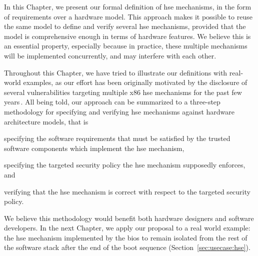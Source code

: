 In this Chapter, we present our formal definition of \ac{hse} mechanisms, in the
form of requirements over a hardware model.
%
This approach makes it possible to reuse the same model to define and verify
several \ac{hse} mechanisms, provided that the model is comprehensive enough in
terms of hardware features.
%
We believe this is an essential property, especially because in practice, these
multiple mechanisms will be implemented concurrently, and may interfere with
each other.

%

Throughout this Chapter, we have tried to illustrate our definitions with
real-world examples, as our effort has been originally motivated by the
disclosure of several vulnerabilities targeting multiple x86 \ac{hse} mechanisms
for the past few
years\,\cite{wojtczuk2009smram,duflot2009smram,rutkowska2008remap,domas2015sinkhole,kallenberg2015racecondition}.
%
All being told, our approach can be summarized to a three-step methodology for
specifying and verifying \ac{hse} mechanisms against hardware architecture
models, that is
%
\begin{inparaenum}[(1)]
\item specifying the software requirements that must be satisfied by the trusted
  software components which implement the \ac{hse} mechanism,
%
\item specifying the targeted security policy the \ac{hse} mechanism supposedly
  enforces, and
%
\item verifying that the \ac{hse} mechanism is correct with respect to the
  targeted security policy.
\end{inparaenum}
%
We believe this methodology would benefit both hardware designers and software
developers.
%
In the next Chapter, we apply our proposal to a real world example: the \ac{hse}
mechanism implemented by the \ac{bios} to remain isolated from the rest of the
software stack after the end of the boot sequence
(Section~\ref{sec:usecase:hse}).
